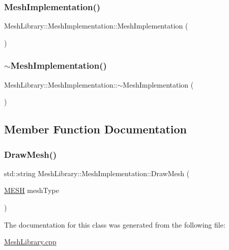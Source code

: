 \subsubsection{\texorpdfstring{MeshImplementation()}{MeshImplementation()}}
{\footnotesize\ttfamily Mesh\+Library\+::\+Mesh\+Implementation\+::\+Mesh\+Implementation (\begin{DoxyParamCaption}{ }\end{DoxyParamCaption})}

\mbox{\label{class_mesh_library_1_1_mesh_implementation_a45b38bb95065ad9ff258d63c60858ca9}} 
\subsubsection{\texorpdfstring{$\sim$MeshImplementation()}{~MeshImplementation()}}
{\footnotesize\ttfamily Mesh\+Library\+::\+Mesh\+Implementation\+::$\sim$\+Mesh\+Implementation (\begin{DoxyParamCaption}{ }\end{DoxyParamCaption})}



\subsection{Member Function Documentation}
\mbox{\label{class_mesh_library_1_1_mesh_implementation_a08e8294ed19a5f1269a73225db7704e5}} 
\subsubsection{\texorpdfstring{DrawMesh()}{DrawMesh()}}
{\footnotesize\ttfamily std\+::string Mesh\+Library\+::\+Mesh\+Implementation\+::\+Draw\+Mesh (\begin{DoxyParamCaption}\item[{\mbox{\hyperlink{_p_i_m_p_l_2_p_i_m_p_l_2_commons_8h_a7d8bc2c54c2771e646f020b8420adafc}{M\+E\+SH}}}]{mesh\+Type }\end{DoxyParamCaption})}



The documentation for this class was generated from the following file\+:\begin{DoxyCompactItemize}
\item 
\mbox{\hyperlink{_mesh_library_8cpp}{Mesh\+Library.\+cpp}}\end{DoxyCompactItemize}
